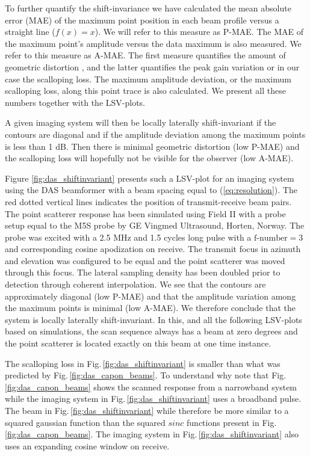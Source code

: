 \documentclass[journal]{IEEEtran}
\begin{document}
To further quantify the shift-invariance we have calculated the mean absolute error (MAE) of the maximum point position in each beam profile versus a straight line ($f(x)=x$). We will refer to this measure as P-MAE. The MAE of the maximum point's amplitude versus the data maximum is also measured. We refer to this measure as A-MAE. The first measure quantifies the amount of geometric distortion \cite{Hergum2007}, and the latter quantifies the peak gain variation or in our case the scalloping loss. The maximum amplitude deviation, or the maximum scalloping loss, along this point trace is also calculated. We present all these numbers together with the LSV-plots.

A given imaging system will then be locally laterally shift-invariant if the contours are diagonal and if the amplitude deviation among the maximum points is less than 1 dB. Then there is minimal geometric distortion (low P-MAE) and the scalloping loss will hopefully not be visible for the observer (low A-MAE). %

Figure \ref{fig:das_shiftinvariant} presents such a LSV-plot for an imaging system using the DAS beamformer with a beam spacing equal to (\ref{eq:resolution}). The red dotted vertical lines indicates the position of transmit-receive beam pairs. The point scatterer response has been simulated using Field II \cite{Jensen1992, Jensen1996a} with a probe setup equal to the M5S probe by GE Vingmed Ultrasound, Horten, Norway. The probe was excited with a 2.5 MHz and 1.5 cycles long pulse with a $\text{f-number}=3$ and corresponding cosine apodization on receive. The transmit focus in azimuth and elevation was configured to be equal and the point scatterer was moved through this focus. The lateral sampling density has been doubled prior to detection through coherent interpolation. We see that the contours are approximately diagonal (low P-MAE) and that the amplitude variation among the maximum points is minimal (low A-MAE). We therefore conclude that the system is locally laterally shift-invariant. In this, and all the following LSV-plots based on simulations, the scan sequence always has a beam at zero degrees and the point scatterer is located exactly on this beam at one time instance.

The scalloping loss in Fig.\,\ref{fig:das_shiftinvariant} is smaller than what was predicted by Fig.\,\ref{fig:das_capon_beams}. To understand why note that Fig.\,\ref{fig:das_capon_beams} shows the scanned response from a narrowband system while the imaging system in Fig.\,\ref{fig:das_shiftinvariant} uses a broadband pulse. The beam in Fig.\,\ref{fig:das_shiftinvariant} while therefore be more similar to a squared gaussian function than the squared $sinc$ functions present in Fig.\,\ref{fig:das_capon_beams}. The imaging system in Fig.\,\ref{fig:das_shiftinvariant} also uses an expanding cosine window on receive.
\end{document}
